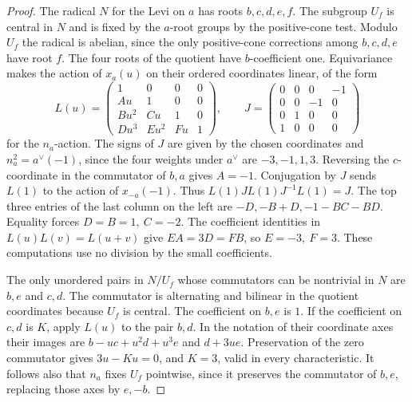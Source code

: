 \documentclass[11pt,a4paper,openany,oneside]{book}
\theoremstyle{resultstyle}
\theoremstyle{definition}
\numberwithin{equation}{chapter}
\begin{document}
\begin{proof}
The radical \(N\) for the Levi on \(a\) has roots \(b,c,d,e,f\).
The subgroup \(U_f\) is central in \(N\) and is fixed by
the \(a\)-root groups by the positive-cone test.
Modulo \(U_f\) the radical is abelian, since the only
positive-cone corrections among \(b,c,d,e\) have root \(f\).
The four roots of the quotient have \(b\)-coefficient one.
Equivariance makes the action of \(x_a(u)\) on their
ordered coordinates linear, of the form
\[
 L(u)=\begin{pmatrix}
  1&0&0&0\\
  Au&1&0&0\\
  Bu^2&Cu&1&0\\
  Du^3&Eu^2&Fu&1
 \end{pmatrix},\qquad
 J=\begin{pmatrix}
  0&0&0&-1\\
  0&0&-1&0\\
  0&1&0&0\\
  1&0&0&0
 \end{pmatrix}
\]
for the \(n_a\)-action. The signs of \(J\) are given by
the chosen coordinates and \(n_a^2=a^\vee(-1)\),
since the four weights under \(a^\vee\) are \(-3,-1,1,3\).
Reversing the \(c\)-coordinate in the commutator of \(b,a\)
gives \(A=-1\). Conjugation by \(J\) sends \(L(1)\)
to the action of \(x_{-a}(-1)\). Thus
\(L(1)J L(1)J^{-1}L(1)=J\).
The top three entries of the last column on the left
are \(-D,-B+D,-1-BC-BD\). Equality forces
\(D=B=1,\ C=-2\). The coefficient identities in
\(L(u)L(v)=L(u+v)\) give \(EA=3D=FB\), so
\(E=-3,\ F=3\). These computations use no division
by the small coefficients.

The only unordered pairs in \(N/U_f\) whose commutators
can be nontrivial in \(N\) are \(b,e\) and \(c,d\).
The commutator is alternating and bilinear in the
quotient coordinates because \(U_f\) is central.
The coefficient on \(b,e\) is \(1\). If the coefficient on
\(c,d\) is \(K\), apply \(L(u)\) to the pair \(b,d\).
In the notation of their coordinate axes their images are
\(b-uc+u^2d+u^3e\) and \(d+3ue\).
Preservation of the zero commutator gives \(3u-Ku=0\),
and \(K=3\), valid in every characteristic.
It follows also that \(n_a\) fixes \(U_f\) pointwise,
since it preserves the commutator of \(b,e\), replacing
those axes by \(e,-b\).


\end{proof}
\end{document}
